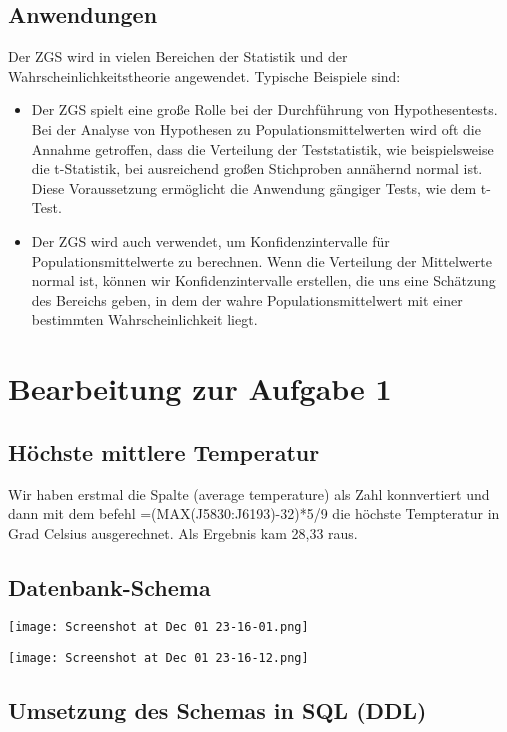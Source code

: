\documentclass{article}
\begin{document}
\subsection{Anwendungen}
Der ZGS wird in vielen Bereichen der Statistik und der Wahrscheinlichkeitstheorie angewendet. Typische Beispiele sind:

\begin{itemize}
    \item Der ZGS spielt eine große Rolle bei der Durchführung von Hypothesentests. Bei der Analyse von Hypothesen zu Populationsmittelwerten wird oft die Annahme getroffen, dass die Verteilung der Teststatistik, wie beispielsweise die t-Statistik, bei ausreichend großen Stichproben annähernd normal ist. Diese Voraussetzung ermöglicht die Anwendung gängiger Tests, wie dem t-Test.

    
\item Der ZGS wird auch verwendet, um Konfidenzintervalle für Populationsmittelwerte zu berechnen. Wenn die Verteilung der Mittelwerte normal ist, können wir Konfidenzintervalle erstellen, die uns eine Schätzung des Bereichs geben, in dem der wahre Populationsmittelwert mit einer bestimmten Wahrscheinlichkeit liegt.




\end{itemize}

\newpage
\section{Bearbeitung zur Aufgabe 1}

\subsection{Höchste mittlere Temperatur }
Wir haben erstmal die Spalte (average temperature) als Zahl konnvertiert und dann mit dem befehl =(MAX(J5830:J6193)-32)*5/9 die höchste Tempteratur in Grad Celsius ausgerechnet. Als Ergebnis kam 28,33 raus.

\subsection{Datenbank-Schema }



\texttt{[image: Screenshot at Dec 01 23-16-01.png]}

\texttt{[image: Screenshot at Dec 01 23-16-12.png]}

\subsection{Umsetzung des Schemas in SQL (DDL)}
\end{document}

